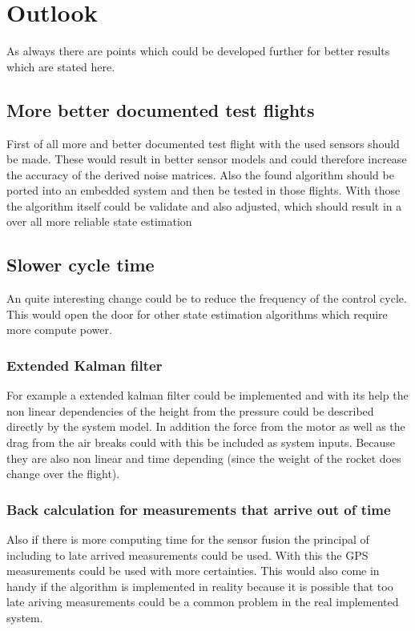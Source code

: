 \section{Outlook}
As always there are points which could be developed further for better results which are stated here.

\subsection{More better documented test flights}
First of all more and better documented test flight with the used sensors should be made.
These would result in better sensor models and could therefore increase the accuracy of the derived noise matrices.
Also the found algorithm should be ported into an embedded system and then be tested in those flights.
With those the algorithm itself could be validate and also adjusted, which should result in a over all more reliable state estimation

\subsection{Slower cycle time}
An quite interesting change could be to reduce the frequency of the control cycle.
This would open the door for other state estimation algorithms which require more compute power.

\subsubsection{Extended Kalman filter}
For example a extended kalman filter could be implemented and with its help the non linear dependencies of the height from the pressure
could be described directly by the system model.
In addition the force from the motor as well as the drag from the air breaks could with this be included as system inputs.
Because they are also non linear and time depending (since the weight of the rocket does change over the flight).

\subsubsection{Back calculation for measurements that arrive out of time}
Also if there is more computing time for the sensor fusion the principal of including to late arrived measurements could be used.
With this the GPS measurements could be used with more certainties.
This would also come in handy if the algorithm is implemented in reality because
it is possible that too late ariving measurements could be a common problem in the real implemented system.

